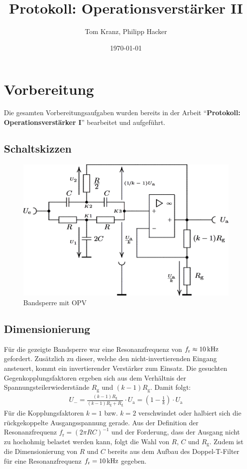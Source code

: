 \documentclass[numbers=noenddot,12pt,a4paper]{scrartcl}
\title{Protokoll: Operationsverstärker II}
\author{Tom Kranz, Philipp Hacker}
\date{\today}
\newcommand{\ix}[1]{_\text{#1}}
\begin{document}
\maketitle
\vspace*{\fill}
\tableofcontents
\vfill
\newpage
\section{Vorbereitung}
Die gesamten Vorbereitungsaufgaben wurden bereits in der Arbeit "`\textbf{Protokoll: Operationsverstärker I}"' bearbeitet und aufgeführt.
\subsection{Schaltskizzen}
\begin{figure}[H]
\centering
\includegraphics[width=\textwidth]{bandsperre.png}
\caption{Bandsperre mit OPV} \label{img:band}
\end{figure}
\subsection{Dimensionierung}
Für die gezeigte Bandsperre war eine Resonanzfrequenz von $f\ix{r}\approx\unit[10]{kHz}$ gefordert. Zusätzlich zu dieser, welche den nicht-invertierenden Eingang ansteuert, kommt ein invertierender Verstärker zum Einsatz. Die gesuchten Gegenkopplungsfaktoren ergeben sich aus dem Verhältnis der Spannungsteilerwiederstände $R\ix{g}$ und $ \left(k-1\right)R\ix{g}$. Damit folgt:
\begin{align*}
U_-=\frac{\left(k-1\right)R\ix{g}}{\left(k-1\right)R\ix{g}+R\ix{g}}\cdot U\ix{a}=\left(1-\frac{1}{k}\right)\cdot U\ix{a}
\end{align*}
Für die Kopplungsfaktoren $k=1$ bzw. $k=2$ verschwindet oder halbiert sich die rückgekoppelte Ausgangsspannung gerade. Aus der Definition der Resonanzfrequenz $f\ix{r}=\left(2\pi R C\right)^{-1}$ und der Forderung, dass der Ausgang nicht zu hochohmig belastet werden kann, folgt die Wahl von $R$, $C$ und $R\ix{g}$. Zudem ist die Dimensionierung von $R$ und $C$ bereits aus dem Aufbau des Doppel-T-Filter für eine Resonanzfrequenz $f\ix{r}=\unit[10]{kHz}$ gegeben.
\end{document}
